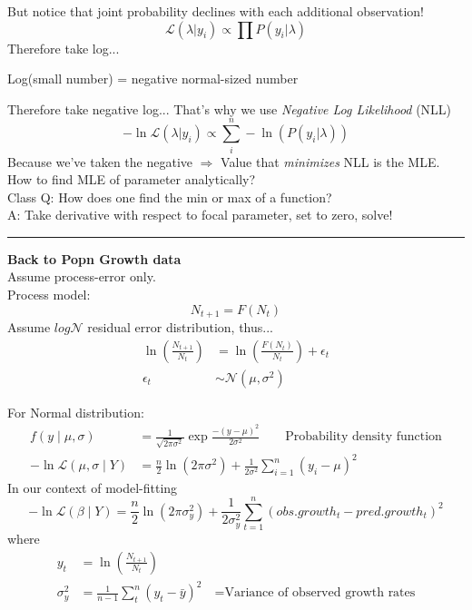 \documentclass{article}
\newcommand{\note}[1]{\colorbox{gray!30}{#1}}
\newcommand{\ind}{\-\hspace{1cm}}
\begin{document}
But notice that joint probability declines with each additional observation!
\begin{equation*}
	\mathcal{L}(\lambda \vert y_i) \propto \prod P(y_i \vert \lambda)
\end{equation*}
Therefore take log...
\begin{center}
	Log(small number) = negative normal-sized number
\end{center}
Therefore take negative log...
That's why we use \emph{Negative Log Likelihood} (NLL)
\begin{equation*}
	-\ln \mathcal{L}(\lambda \vert y_i) \propto \sum_i^n -\ln( P(y_i \vert \lambda))
\end{equation*}
Because we've taken the negative $\Rightarrow$ Value that \emph{minimizes} NLL is the MLE.\\

How to find MLE of parameter analytically?\\
\note{Class Q:}  How does one find the min or max of a function?\\
\ind \note{A:} Take derivative with respect to focal parameter, set to zero, solve!

\rule[0.5ex]{\linewidth}{1pt}
\textbf{Back to Popn Growth data}\\
Assume process-error only.\\
\ind Process model: 
\begin{equation*}
	N_{t+1} = F(N_t)
\end{equation*}
Assume $log\mathcal{N}$ residual error distribution, thus...
\begin{align*}
	\ln \left(\frac{N_{t+1}}{N_t}\right) &= \ln \left(\frac{F(N_t)}{N_t}\right) + \epsilon_t\\
	\epsilon_t &\sim \mathcal{N}(\mu,\sigma^2)
\end{align*}

For Normal distribution:
\begin{align*}
	f(y\mid \mu,\sigma) & =\frac{1}{\sqrt{2 \pi \sigma^2}} \exp \frac{-(y-\mu)^2}{2\sigma^2} \quad \quad \text{Probability density function}\\
	-\ln \mathcal{L}(\mu, \sigma \mid Y) &=   \frac{n}{2} \ln \left(2 \pi \sigma^2 \right) + \frac{1}{2\sigma^2}\sum_{i=1}^n (y_i - \mu)^2
\end{align*}
In our context of model-fitting
\begin{equation*}
	-\ln \mathcal{L}(\beta \mid Y) =   \frac{n}{2} \ln \left(2 \pi \sigma_y^2 \right) + \frac{1}{2 \sigma_y^2}  \sum_{t=1}^n (obs.growth_t- pred.growth_t)^2
\end{equation*}
where
\begin{align*}
	y_t &= \ln\left(\frac{N_{t+1}}{N_t}\right)\\
	\sigma_y^2  &= \frac{1}{n-1} \sum_t^n (y_t - \bar{y})^2 \quad \text{=Variance of observed growth rates}
\end{align*}
\end{document}
